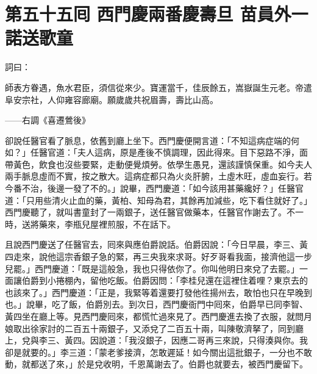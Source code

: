 
\chapter*{第五十五囘 西門慶兩番慶壽旦 苗員外一諾送歌童}


詞曰：

師表方眷遇，魚水君臣，須信從來少。寶運當千，佳辰餘五，嵩嶽誕生元老。帝遣阜安宗社，人仰雍容廊廟。願歲歲共祝眉壽，壽比山高。

——右調《喜遷鶯後》

卻說任醫官看了脈息，依舊到廳上坐下。西門慶便開言道：「不知這病症端的何如？」任醫官道：「夫人這病，原是產後不慎調理，因此得來。目下惡路不淨，面帶黃色，飲食也沒些要緊，走動便覺煩勞。依學生愚見，還該謹慎保重。如今夫人兩手脈息虛而不實，按之散大。這病症都只為火炎肝腑，土虛木旺，虛血妄行。若今番不治，後邊一發了不的。」說畢，西門慶道：「如今該用甚藥纔好？」任醫官道：「只用些清火止血的藥，黃柏、知母為君，其餘再加減些，吃下看住就好了。」{}西門慶聽了，就叫書童封了一兩銀子，送任醫官做藥本，任醫官作謝去了。不一時，送將藥來，李瓶兒屋裡煎服，不在話下。

且說西門慶送了任醫官去，囘來與應伯爵說話。伯爵因說：「今日早晨，李三、黃四走來，說他這宗香銀子急的緊，再三央我來求哥。好歹哥看我面，接濟他這一步兒罷。」西門慶道：「既是這般急，我也只得依你了。你叫他明日來兌了去罷。」一面讓伯爵到小捲棚內，留他吃飯。伯爵因問：「李桂兒還在這裡住着哩？東京去的也該來了。」西門慶道：「正是，我緊等着還要打發他徃揚州去，敢怕也只在早晚到也。」說畢，吃了飯，伯爵別去。到次日，西門慶衙門中囘來，伯爵早已同李智、黃四坐在廳上等。見西門慶囘來，都慌忙過來見了。西門慶進去換了衣服，就問月娘取出徐家討的二百五十兩銀子，又添兌了二百五十兩，叫陳敬濟拏了，同到廳上，兌與李三、黃四。因說道：「我沒銀子，因應二哥再三來說，只得湊與你。我卻是就要的。」李三道：「蒙老爹接濟，怎敢遲延！如今關出這批銀子，一分也不敢動，就都送了來，」於是兌收明，千恩萬謝去了。伯爵也就要去，被西門慶留下。

